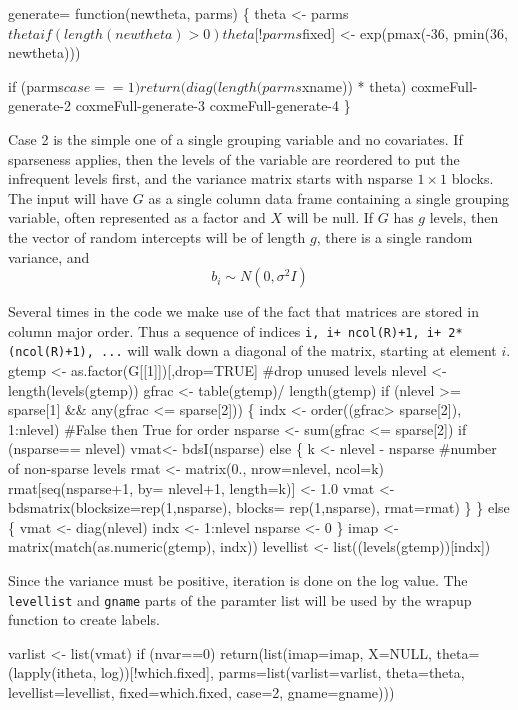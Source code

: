 \documentclass{article}
\begin{document}
\nwenddocs{}\endmoddef
generate= function(newtheta, parms) \{
    theta <- parms$theta
    if (length(newtheta)>0) theta[!parms$fixed] <- 
        exp(pmax(-36, pmin(36, newtheta)))

    if (parms$case==1) return(diag(length(parms$xname)) * theta)
    \LA{}coxmeFull-generate-2\RA{}
    \LA{}coxmeFull-generate-3\RA{}
    \LA{}coxmeFull-generate-4\RA{}
    \}
\nwendcode{}\nwdocspar

Case 2 is the simple one of a single grouping variable and
no covariates. If sparseness
applies, then the levels of the variable are reordered to put the
infrequent levels first, and the variance matrix starts with
nsparse $1\times 1$ blocks.
The input will have $G$ as a single column data frame containing a single
grouping variable, often represented as a factor and  $X$ will be null.
If $G$ has $g$ levels, then the vector of random intercepts will be of
length $g$, there is a single random variance, and
$$
b_i \sim N(0, \sigma^2 I)
$$

Several times in the code we make use of the fact that matrices are
stored in column major order.  Thus a sequence of indices
{\tt{}i,\ i+\ ncol(R)+1,\ i+\ 2*(ncol(R)+1),\ ...} will walk down a diagonal
of the matrix, starting at element $i$.
\nwenddocs{}\endmoddef
gtemp <- as.factor(G[[1]])[,drop=TRUE] #drop unused levels
nlevel <- length(levels(gtemp))
gfrac <- table(gtemp)/ length(gtemp)
if (nlevel >= sparse[1] && any(gfrac <= sparse[2])) \{
    indx <- order((gfrac> sparse[2]), 1:nlevel)  #False then True for order
    nsparse <- sum(gfrac <= sparse[2])
    if (nsparse== nlevel) vmat<- bdsI(nsparse)
    else \{
        k <- nlevel - nsparse  #number of non-sparse levels
        rmat <- matrix(0., nrow=nlevel, ncol=k)
        rmat[seq(nsparse+1, by= nlevel+1, length=k)] <- 1.0
        vmat <- bdsmatrix(blocksize=rep(1,nsparse), 
                          blocks= rep(1,nsparse), rmat=rmat)
        \}
    \}
else \{
    vmat <- diag(nlevel)
    indx <- 1:nlevel
    nsparse <- 0
    \}
imap <- matrix(match(as.numeric(gtemp), indx))
levellist <- list((levels(gtemp))[indx]) 
\nwendcode{}\nwdocspar

Since the variance must be positive, iteration is done on the
log value.  
The {\tt{}levellist} and {\tt{}gname} parts of the paramter list will be used
by the wrapup function to create labels.

\nwenddocs{}\plusendmoddef
varlist <- list(vmat)
if (nvar==0) 
    return(list(imap=imap, X=NULL, 
                theta=(lapply(itheta, log))[!which.fixed], 
                parms=list(varlist=varlist, theta=theta, levellist=levellist,
                           fixed=which.fixed, case=2, gname=gname)))
\nwendcode{}          
\end{document}
